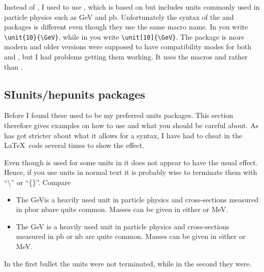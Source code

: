 Instead of , I used to use , which
is based on  but includes units commonly used in
particle physics such as \si{\GeV} and \si{\pico\barn}. Unfortunately
the syntax of the  and  packages is
different even though they use the same macro name.
In  you write \verb+\unit{10}{\GeV}+, while in
 you write \verb+\unit[10]{\GeV}+.
The  package is more modern and older versions were
supposed to have compatibility modes for both  and
, but I had problems getting them working. It uses the
macros  and  rather than .

\subsection{SIunits/hepunits packages}%
\label{sec:app:tips:siunits}

Before I found  these used to be my preferred units
packages.
This section therefore gives examples on how to use 
and what you should be careful about. As  has got
stricter about what it allows for a syntax, I have had to cheat in the
\LaTeX\ code several times to show the effect.

Even though  is used for some units in 
it does not appear to have the usual effect.
Hence, if you use units in normal text it is probably wise to
terminate them with \enquote{\textbackslash } or \enquote{\{\}}. Compare
\begin{itemize}
\item The \si{\GeV}is a
  heavily used unit in particle physics and cross-sections measured in
  \si{\pico\barn}or \si{\nano\barn}are quite common.
  Masses can be given in either \si{\MeVovercsq}or \si{\MeV}.
\item The \si{\GeV} is a
  heavily used unit in particle physics and cross-sections measured in
  \si{\pico\barn} or \si{\nano\barn} are quite common.
  Masses can be given in either \si{\MeVovercsq} or \si{\MeV}.
\end{itemize}
In the first bullet the units were not terminated, while in the second
they were.

